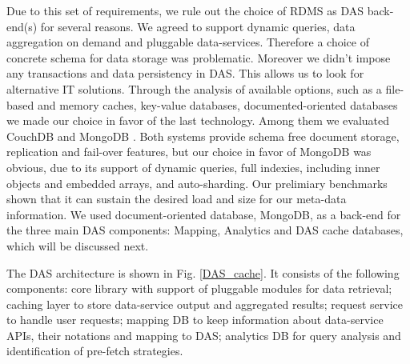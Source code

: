 \documentclass[a4paper]{jpconf}
\begin{document}
\noindent
Due to this set of requirements, we rule out the choice of RDMS as DAS back-end(s)
for several reasons. We agreed to support dynamic queries, data
aggregation on demand and pluggable data-services. Therefore a choice 
of concrete schema for data storage was problematic. Moreover we didn't impose
any transactions and data persistency in DAS. This allows us to look 
for alternative IT solutions.
Through the analysis of available options, such as a file-based and memory caches, 
key-value databases, documented-oriented databases we made our choice in favor 
of the last technology. Among them we evaluated CouchDB \cite{CouchDB} and 
MongoDB \cite{MongoDB}. Both systems provide schema free document
storage, replication and fail-over features, but our choice in favor of 
MongoDB was obvious, due to its support of dynamic queries, 
full indexies, including inner objects and embedded arrays,
and auto-sharding. Our prelimiary benchmarks shown that it can sustain
the desired load and size for our meta-data information. We used 
document-oriented database, MongoDB, as a back-end for the three 
main DAS components: Mapping, Analytics and DAS cache databases, 
which will be discussed next. 

The DAS architecture is shown in Fig. \ref{DAS_cache}. It consists of the
following components:
core library with support of pluggable modules for data retrieval;
caching layer to store data-service output and aggregated results;
request service to handle user requests;
mapping DB to keep information about data-service APIs, their
notations and mapping to DAS;
analytics DB for query analysis and identification of pre-fetch 
strategies.
\end{document}
